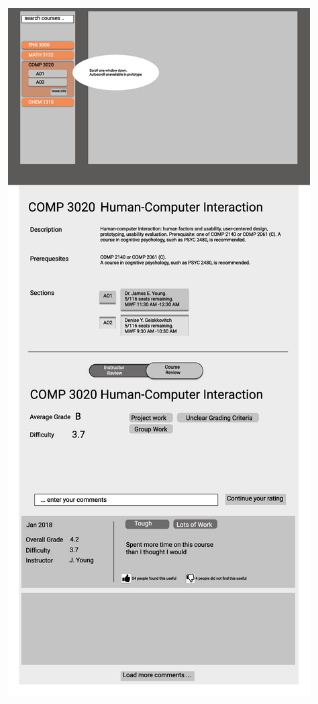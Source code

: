 \documentclass{article}
\begin{document}
\begin{figure}[h]
        \includegraphics[width=8cm]{ViewCourseInfo_Prototype/Course_Instructor4.jpg}
    \end{figure}
\newpage
\end{document}
